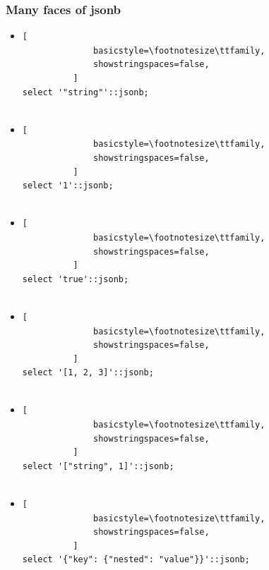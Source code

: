 \documentclass[14pt, compress]{beamer}
\begin{document}
\begin{frame}[fragile]
    \frametitle{Many faces of jsonb}

  \begin{itemize}
      \item<+->
          \begin{lstlisting}[
              basicstyle=\footnotesize\ttfamily,
              showstringspaces=false,
          ]
select '"string"'::jsonb;
         
          \end{lstlisting}

      \item<+->
          \begin{lstlisting}[
              basicstyle=\footnotesize\ttfamily,
              showstringspaces=false,
          ]
select '1'::jsonb;
         
          \end{lstlisting}

      \item<+->
          \begin{lstlisting}[
              basicstyle=\footnotesize\ttfamily,
              showstringspaces=false,
          ]
select 'true'::jsonb;
         
          \end{lstlisting}

      \item<+->
          \begin{lstlisting}[
              basicstyle=\footnotesize\ttfamily,
              showstringspaces=false,
          ]
select '[1, 2, 3]'::jsonb;
         
          \end{lstlisting}

      \item<+->
          \begin{lstlisting}[
              basicstyle=\footnotesize\ttfamily,
              showstringspaces=false,
          ]
select '["string", 1]'::jsonb;
         
          \end{lstlisting}

      \item<+->
          \begin{lstlisting}[
              basicstyle=\footnotesize\ttfamily,
              showstringspaces=false,
          ]
select '{"key": {"nested": "value"}}'::jsonb;
         
          \end{lstlisting}

  \end{itemize}

\end{frame}
\end{document}
